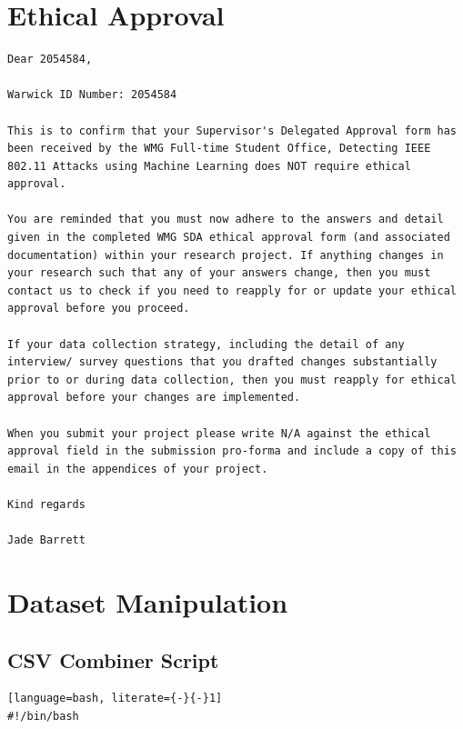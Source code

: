 \begin{appendices}



\section{Ethical Approval}
\begin{lstlisting}[language={}]
Dear 2054584,

Warwick ID Number: 2054584 

This is to confirm that your Supervisor's Delegated Approval form has been received by the WMG Full-time Student Office, Detecting IEEE 802.11 Attacks using Machine Learning does NOT require ethical approval.

You are reminded that you must now adhere to the answers and detail given in the completed WMG SDA ethical approval form (and associated documentation) within your research project. If anything changes in your research such that any of your answers change, then you must contact us to check if you need to reapply for or update your ethical approval before you proceed.

If your data collection strategy, including the detail of any interview/ survey questions that you drafted changes substantially prior to or during data collection, then you must reapply for ethical approval before your changes are implemented. 

When you submit your project please write N/A against the ethical approval field in the submission pro-forma and include a copy of this email in the appendices of your project.

Kind regards

Jade Barrett
\end{lstlisting}

\newpage
\section{Dataset Manipulation}

\subsection{CSV Combiner Script}
\label{appx: CSV Combiner Script}
\begin{lstlisting}[language=bash, literate={-}{-}1]
#!/bin/bash


\end{lstlisting}
\end{appendices}
